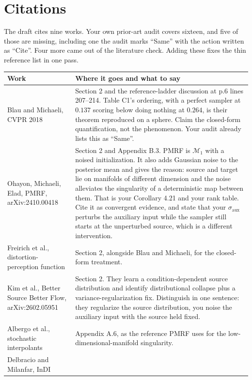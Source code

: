 \documentclass[11pt]{article}
\newcommand{\M}{\mathcal M}
\begin{document}
\section{Citations}

The draft cites nine works. Your own prior-art audit covers sixteen, and five of those are
missing, including one the audit marks ``Same'' with the action written as ``Cite''. Four more
came out of the literature check. Adding these fixes the thin reference list in one pass.

\begin{longtable}{@{}p{}p{}@{}}
\toprule
Work & Where it goes and what to say\\
\midrule
\endhead
Blau and Michaeli, CVPR 2018 &
Section 2 and the reference-ladder discussion at p.6 lines 207--214. Table C1's ordering, with a
perfect sampler at $0.137$ scoring below doing nothing at $0.264$, is their theorem reproduced on
a sphere. Claim the closed-form quantification, not the phenomenon. Your audit already lists this
as ``Same''.\\
\addlinespace
Ohayon, Michaeli, Elad, PMRF, arXiv:2410.00418 &
Section 2 and Appendix B.3. PMRF is $\M_1$ with a noised initialization. It also adds Gaussian
noise to the posterior mean and gives the reason: source and target lie on manifolds of different
dimension and the noise alleviates the singularity of a deterministic map between them. That is
your Corollary 4.21 and your rank table. Cite it as convergent evidence, and state that your
$\sigma_{\mathrm{aux}}$ perturbs the auxiliary input while the sampler still starts at the
unperturbed source, which is a different intervention.\\
\addlinespace
Freirich et al., distortion-perception function &
Section 2, alongside Blau and Michaeli, for the closed-form treatment.\\
\addlinespace
Kim et al., Better Source Better Flow, arXiv:2602.05951 &
Section 2. They learn a condition-dependent source distribution and identify distributional
collapse plus a variance-regularization fix. Distinguish in one sentence: they regularize the
source distribution, you noise the auxiliary input with the source held fixed.\\
\addlinespace
Albergo et al., stochastic interpolants &
Appendix A.6, as the reference PMRF uses for the low-dimensional-manifold singularity.\\
\addlinespace
Delbracio and Milanfar, InDI &

\end{longtable}
\end{document}

